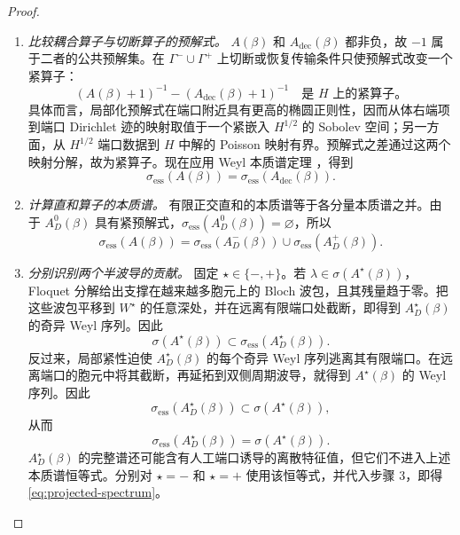 \begin{proof}
\begin{enumerate}[label=\textit{步骤 \arabic*.},leftmargin=*,start=2]

\item \emph{比较耦合算子与切断算子的预解式。}
$A(\beta)$ 和 $A_{\mathrm{dec}}(\beta)$ 都非负，故 $-1$ 属于二者的公共预解集。在 $\Gamma^-\cup\Gamma^+$ 上切断或恢复传输条件只使预解式改变一个紧算子：
\begin{equation*}
  (A(\beta)+1)^{-1}-(A_{\mathrm{dec}}(\beta)+1)^{-1}
  \quad\text{是 }H\text{ 上的紧算子。}
\end{equation*}
具体而言，局部化预解式在端口附近具有更高的椭圆正则性，因而从体右端项到端口 Dirichlet 迹的映射取值于一个紧嵌入 $H^{1/2}$ 的 Sobolev 空间；另一方面，从 $H^{1/2}$ 端口数据到 $H$ 中解的 Poisson 映射有界。预解式之差通过这两个映射分解，故为紧算子。现在应用 Weyl 本质谱定理 \cite[Theorem~XIII.14]{ReedSimon1978}，得到
\[
  \sigma_{\mathrm{ess}}(A(\beta))
  =\sigma_{\mathrm{ess}}(A_{\mathrm{dec}}(\beta)).
\]

\item \emph{计算直和算子的本质谱。}
有限正交直和的本质谱等于各分量本质谱之并。由于 $A_D^0(\beta)$ 具有紧预解式，$\sigma_{\mathrm{ess}}(A_D^0(\beta))=\varnothing$，所以
\[
  \sigma_{\mathrm{ess}}(A(\beta))
  =\sigma_{\mathrm{ess}}(A_D^-(\beta))
   \cup\sigma_{\mathrm{ess}}(A_D^+(\beta)).
\]

\item \emph{分别识别两个半波导的贡献。}
固定 $\star\in\{-,+\}$。若 $\lambda\in\sigma(A^\star(\beta))$，Floquet 分解给出支撑在越来越多胞元上的 Bloch 波包，且其残量趋于零。把这些波包平移到 $W^\star$ 的任意深处，并在远离有限端口处截断，即得到 $A_D^\star(\beta)$ 的奇异 Weyl 序列。因此
\[
  \sigma(A^\star(\beta))
  \subset\sigma_{\mathrm{ess}}(A_D^\star(\beta)).
\]
反过来，局部紧性迫使 $A_D^\star(\beta)$ 的每个奇异 Weyl 序列逃离其有限端口。在远离端口的胞元中将其截断，再延拓到双侧周期波导，就得到 $A^\star(\beta)$ 的 Weyl 序列。因此
\[
  \sigma_{\mathrm{ess}}(A_D^\star(\beta))
  \subset\sigma(A^\star(\beta)),
\]
从而
\[
  \sigma_{\mathrm{ess}}(A_D^\star(\beta))
  =\sigma(A^\star(\beta)).
\]
$A_D^\star(\beta)$ 的完整谱还可能含有人工端口诱导的离散特征值，但它们不进入上述本质谱恒等式。分别对 $\star=-$ 和 $\star=+$ 使用该恒等式，并代入步骤 3，即得 \eqref{eq:projected-spectrum}。
\end{enumerate}
\end{proof}

